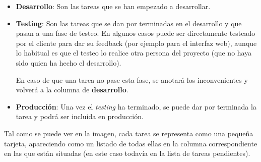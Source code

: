 \documentclass{\ClassPath/viu-tfm-template}
\begin{document}
\begin{minipage}{0.60\linewidth}
    \begin{itemize}
        \item \textbf{Desarrollo}: Son las tareas que se han empezado a desarrollar.
        \item \textbf{Testing}: Son las tareas que se dan por terminadas en el desarrollo y que pasan a una fase de testeo. En algunos casos puede ser directamente testeado por el cliente para dar su feedback (por ejemplo para el interfaz web), aunque lo habitual es que el testeo lo realice otra persona del proyecto (que no haya sido quien ha hecho el desarrollo).

        En caso de que una tarea no pase esta fase, se anotará los inconvenientes y volverá a la columna de \textbf{desarrollo}.
        \item \textbf{Producción}: Una vez el \textit{testing} ha terminado, se puede dar por terminada la tarea y podrá ser incluida en producción.
    \end{itemize}

    Tal como se puede ver en la imagen, cada tarea se representa como una pequeña tarjeta, apareciendo como un listado de todas ellas en la columna correspondiente en las que están situadas (en este caso todavía en la lista de tareas pendientes).
\end{minipage}
\hfill
\end{document}
